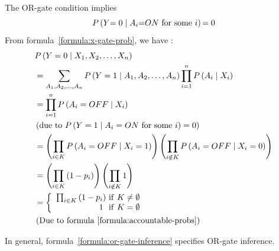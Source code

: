 \documentclass{article}
\numberwithin{equation}{section}
\numberwithin{figure}{section}
\numberwithin{table}{section}
\begin{document}
The OR-gate condition implies
\[P\left(Y\mathrm{=0}\mathrel{\left|\vphantom{Y\mathrm{=0} A_i\mathrm{=}ON\mathrm{\ for\ some\ }i}\right.\kern-\nulldelimiterspace}A_i\mathrm{=}ON\mathrm{\ for\ some\ }i\right)\mathrm{=0}\] 
From formula~\ref{formula:x-gate-prob}, we have \cite[p.~159]{neapolitan:bn}:
\begin{align*}
&P\left(Y=0\mathrel{\left|\vphantom{Y=0 X_1,X_2,\dots ,X_n}\right.\kern-\nulldelimiterspace}X_1,X_2,\dots ,X_n\right)\\
&=\sum_{A_1,A_2,\dots ,A_n}{P\left(Y=1\mathrel{\left|\vphantom{Y=1 A_1,A_2,\dots ,A_n}\right.\kern-\nulldelimiterspace}A_1,A_2,\dots ,A_n\right)\prod^n_{i=1}{P\left(A_i\mathrel{\left|\vphantom{A_i X_i}\right.\kern-\nulldelimiterspace}X_i\right)}}\\ 
&=\prod^n_{i=1}{P\left(A_i=OFF\mathrel{\left|\vphantom{A_i=OFF X_i}\right.\kern-\nulldelimiterspace}X_i\right)}\\
&\left(\mathrm{due\ to\ }P\left(Y=1\mathrel{\left|\vphantom{Y=1 A_i=ON\ \mathrm{for\ some}\ i}\right.\kern-\nulldelimiterspace}A_i=ON\ \mathrm{for\ some}\ i\right)=0\right)\\
&=\left(\prod_{i\in K}{P\left(A_i=OFF\mathrel{\left|\vphantom{A_i=OFF X_i=1}\right.\kern-\nulldelimiterspace}X_i=1\right)}\right)\left(\prod_{i\notin K}{P\left(A_i=OFF\mathrel{\left|\vphantom{A_i=OFF X_i=0}\right.\kern-\nulldelimiterspace}X_i=0\right)}\right)\\
&=\left(\prod_{i\in K}{\left(1-p_i\right)}\right)\left(\prod_{i\notin K}{1}\right)\\
&=\left\{ \begin{array}{r}
\prod_{i\in K}{\left(1-p_i\right)}\ \mathrm{if}\ K\neq \emptyset  \\ 
1\ \ \mathrm{if}\ K=\emptyset  \end{array}
\right.\\
&\left(\mathrm{Due}\ \mathrm{to}\ \mathrm{formula}\ \mathrm{\ref{formula:accountable-probs}}\right)
\end{align*}

In general, formula~\ref{formula:or-gate-inference} specifies OR-gate inference.
\end{document}
